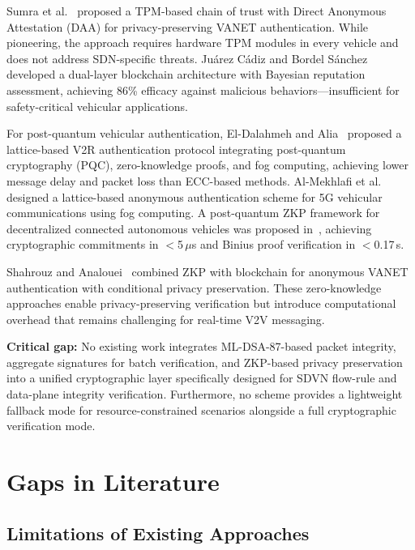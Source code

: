 \documentclass[12pt, a4paper]{report}
\begin{document}
Sumra et al.~\cite{Sumra2011} proposed a TPM-based chain of trust with Direct Anonymous Attestation (DAA) for privacy-preserving VANET authentication. While pioneering, the approach requires hardware TPM modules in every vehicle and does not address SDN-specific threats. Ju\'{a}rez C\'{a}diz and Bordel S\'{a}nchez~\cite{JuarezCadiz2023} developed a dual-layer blockchain architecture with Bayesian reputation assessment, achieving 86\% efficacy against malicious behaviors—insufficient for safety-critical vehicular applications.

For post-quantum vehicular authentication, El-Dalahmeh and Alia~\cite{ElDalahmeh2025} proposed a lattice-based V2R authentication protocol integrating post-quantum cryptography (PQC), zero-knowledge proofs, and fog computing, achieving lower message delay and packet loss than ECC-based methods. Al-Mekhlafi et al.~\cite{AlMekhlafi2024} designed a lattice-based anonymous authentication scheme for 5G vehicular communications using fog computing. A post-quantum ZKP framework for decentralized connected autonomous vehicles was proposed in~\cite{PQZKP2025}, achieving cryptographic commitments in $<$5\,$\mu$s and Binius proof verification in $<$0.17\,s.

Shahrouz and Analouei~\cite{Shahrouz2024} combined ZKP with blockchain for anonymous VANET authentication with conditional privacy preservation. These zero-knowledge approaches enable privacy-preserving verification but introduce computational overhead that remains challenging for real-time V2V messaging.

\textbf{Critical gap:} No existing work integrates ML-DSA-87-based packet integrity, aggregate signatures for batch verification, and ZKP-based privacy preservation into a unified cryptographic layer specifically designed for SDVN flow-rule and data-plane integrity verification. Furthermore, no scheme provides a lightweight fallback mode for resource-constrained scenarios alongside a full cryptographic verification mode.

\section{Gaps in Literature}

\subsection{Limitations of Existing Approaches}
\end{document}
